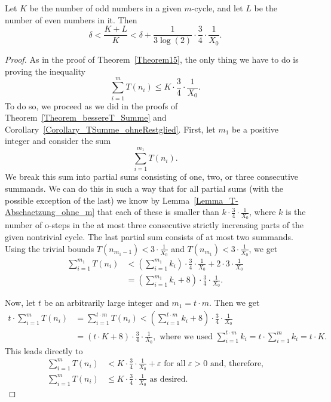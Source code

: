 \documentclass[12pt,reqno]{article}
\begin{document}
\begin{theorem}\label{Theorem-Abschaetzungohnem}
Let $K$ be the number of odd numbers in a given $m$-cycle, and let $L$ be the number of even numbers in it. Then
\[\delta <\frac{K+L}{K}<\delta+\frac{1}{3 \log(2)} \cdot \frac{3}{4} \cdot \frac{1}{X_0}.\]
\end{theorem}

\begin{proof}
As in the proof of Theorem~\ref{Theorem15}, the only thing we have to do is proving the inequality
\[\sum_{i=1}^m T(n_i) \leq K \cdot \frac{3}{4} \cdot \frac{1}{X_0}.\]
To do so, we proceed as we did in the proofs of Theorem~\ref{Theorem_bessereT_Summe} and Corollary~\ref{Corollary_TSumme_ohneRestglied}. First, let $m_1$ be a positive integer and consider the sum \[\sum_{i=1}^{m_1} T(n_i).\] We break this sum into partial sums consisting of one, two, or three consecutive summands. We can do this in such a way that for all partial sums (with the possible exception of the last) we know by Lemma~\ref{Lemma_T-Abschaetzung_ohne_m} that each of these is smaller than $k \cdot \tfrac{3}{4} \cdot \tfrac{1}{X_0}$, where $k$ is the number of o-steps in the at most three consecutive strictly increasing parts of the given nontrivial cycle. The last partial sum consists of at most two summands. Using the trivial bounds $T(n_{m_1-1})<3\cdot \tfrac{1}{X_0}$ and $T(n_{m_1})<3\cdot \tfrac{1}{X_0}$, we get
\begin{align*}
\sum_{i=1}^{m_1} T(n_i) &< \left(\sum_{i=1}^{m_1} k_i\right) \cdot \frac{3}{4} \cdot \frac{1}{X_0} + 2\cdot 3 \cdot \frac{1}{X_0}\\
\quad &=\left(\sum_{i=1}^{m_1} k_i + 8\right) \cdot \frac{3}{4} \cdot \frac{1}{X_0}.
\end{align*}

Now, let $t$ be an arbitrarily large integer and $m_1=t\cdot m$. Then we get
\begin{align*}
t\cdot \sum_{i=1}^m T(n_i) &= \sum_{i=1}^{t\cdot m} T(n_i) < \left(\sum_{i=1}^{t\cdot m} k_i + 8\right) \cdot \frac{3}{4} \cdot \frac{1}{X_0}\\
\quad &=(t\cdot K + 8)\cdot  \frac{3}{4} \cdot \frac{1}{X_0}, \text{ where we used $\sum_{i=1}^{t\cdot m} k_i=t\cdot \sum_{i=1}^{m} k_i=t\cdot K$.}
\end{align*}
This leads directly to
\begin{align*}
\sum_{i=1}^m T(n_i) &<K\cdot  \frac{3}{4} \cdot \frac{1}{X_0} + \varepsilon \text{ for all $\varepsilon>0$ and, therefore,}\\
\sum_{i=1}^m T(n_i) &\leq K\cdot  \frac{3}{4} \cdot \frac{1}{X_0} \text{ as desired.}
\end{align*}
 \end{proof}
\end{document}
